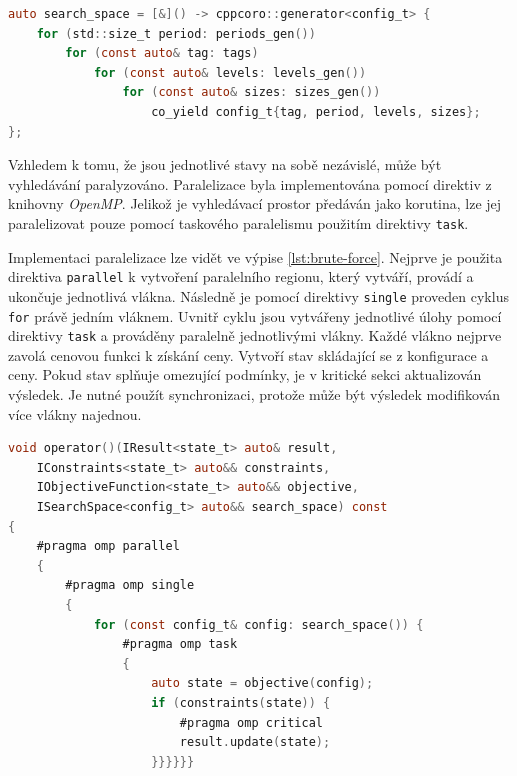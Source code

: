 \begin{lstlisting}[caption={~Ukázka generování systematického stavového prostoru},label={lst:systematic:states_generator},captionpos=t,abovecaptionskip=-\medskipamount,belowcaptionskip=\medskipamount,language=C]
auto search_space = [&]() -> cppcoro::generator<config_t> {
    for (std::size_t period: periods_gen())
        for (const auto& tag: tags)
            for (const auto& levels: levels_gen())
                for (const auto& sizes: sizes_gen())
                    co_yield config_t{tag, period, levels, sizes};
};
\end{lstlisting}

Vzhledem k tomu, že jsou jednotlivé stavy na sobě nezávislé, může být vyhledávání paralyzováno.
Paralelizace byla implementována pomocí direktiv z knihovny \textit{OpenMP}.
Jelikož je vyhledávací prostor předáván jako korutina, lze jej paralelizovat pouze pomocí taskového paralelismu použitím direktivy \texttt{task}.

Implementaci paralelizace lze vidět ve výpise \ref{lst:brute-force}.
Nejprve je použita direktiva \texttt{parallel} k vytvoření paralelního regionu, který vytváří, provádí a ukončuje jednotlivá vlákna.
Následně je pomocí direktivy \texttt{single} proveden cyklus \texttt{for} právě jedním vláknem.
Uvnitř cyklu jsou vytvářeny jednotlivé úlohy pomocí direktivy \texttt{task} a prováděny paralelně jednotlivými vlákny.
Každé vlákno nejprve zavolá cenovou funkci k získání ceny.
Vytvoří stav skládající se z konfigurace a ceny.
Pokud stav splňuje omezující podmínky, je v kritické sekci aktualizován výsledek.
Je nutné použít synchronizaci, protože může být výsledek modifikován více vlákny najednou.

\begin{lstlisting}[caption={~Optimalizace pomocí algoritmu hrubé síly},label={lst:brute-force},captionpos=t,abovecaptionskip=-\medskipamount,belowcaptionskip=\medskipamount,language=C]
void operator()(IResult<state_t> auto& result,
    IConstraints<state_t> auto&& constraints,
    IObjectiveFunction<state_t> auto&& objective,
    ISearchSpace<config_t> auto&& search_space) const
{
    #pragma omp parallel
    {
        #pragma omp single
        {
            for (const config_t& config: search_space()) {
                #pragma omp task
                {
                    auto state = objective(config);
                    if (constraints(state)) {
                        #pragma omp critical
                        result.update(state);
                    }}}}}}
\end{lstlisting}

